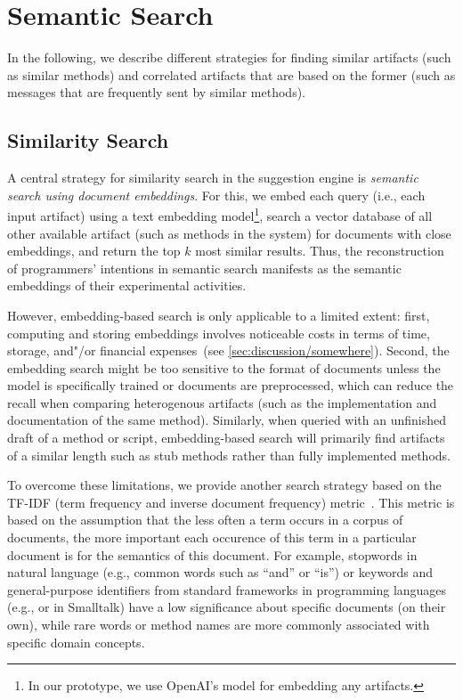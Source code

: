 
\section{Semantic Search}
\label{sec:suggestions/search}

In the following, we describe different strategies for finding similar artifacts (such as similar methods) and correlated artifacts that are based on the former (such as messages that are frequently sent by similar methods).

\subsection{Similarity Search}
\label{sec:suggestions/search/similar}

A central strategy for similarity search in the suggestion engine is \emph{semantic search using document embeddings}.
For this, we embed each query (i.e., each input artifact) using a text embedding model\footnote{In our prototype, we use OpenAI's  model for embedding any artifacts.}, search a vector database of all other available artifact (such as methods in the system) for documents with close embeddings, and return the top $k$ most similar results.
Thus, the reconstruction of programmers' intentions in semantic search manifests as the semantic embeddings of their experimental activities.

However, embedding-based search is only applicable to a limited extent:
first, computing and storing embeddings involves noticeable costs in terms of time, storage, and"/or financial expenses~(see \cref{sec:discussion/somewhere}).
Second, the embedding search might be too sensitive to the format of documents unless the model is specifically trained or documents are preprocessed, which can reduce the recall when comparing heterogenous artifacts (such as the implementation and documentation of the same method).
Similarly, when queried with an unfinished draft of a method or script, embedding-based search will primarily find artifacts of a similar length such as stub methods rather than fully implemented methods.

To overcome these limitations, we provide another search strategy based on the TF-IDF (term frequency and inverse document frequency) metric~\cite{salton1988term}.
This metric is based on the assumption that the less often a term occurs in a corpus of documents, the more important each occurence of this term in a particular document is for the semantics of this document.
For example, stopwords in natural language (e.g., common words such as ``and'' or ``is'') or keywords and general-purpose identifiers from standard frameworks in programming languages (e.g.,  or  in Smalltalk) have a low significance about specific documents (on their own), while rare words or method names are more commonly associated with specific domain concepts.

